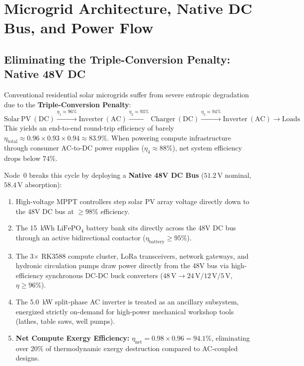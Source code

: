 \section{Microgrid Architecture, Native DC Bus, and Power Flow}
\label{sec:l1_microgrid}

\subsection{Eliminating the Triple-Conversion Penalty: Native 48V DC}

Conventional residential solar microgrids suffer from severe entropic degradation due to the \textbf{Triple-Conversion Penalty}:
\begin{equation}
\mathrm{Solar~PV~(DC)} \stackrel{\eta_1 \approx 96\%}{\longrightarrow} \mathrm{Inverter~(AC)} \stackrel{\eta_2 \approx 93\%}{\longrightarrow} \mathrm{Charger~(DC)} \stackrel{\eta_3 \approx 94\%}{\longrightarrow} \mathrm{Inverter~(AC)} \longrightarrow \mathrm{Loads}
\label{eq:ac_coupling_loss}
\end{equation}
This yields an end-to-end round-trip efficiency of barely $\eta_{\mathrm{total}} \approx 0.96 \times 0.93 \times 0.94 \approx 83.9\%$. When powering compute infrastructure through consumer AC-to-DC power supplies ($\eta_4 \approx 88\%$), net system efficiency drops below $74\%$.

Node~0 breaks this cycle by deploying a \textbf{Native 48V DC Bus} ($51.2\,\mathrm{V}$ nominal, $58.4\,\mathrm{V}$ absorption):
\begin{enumerate}
    \item High-voltage MPPT controllers step solar PV array voltage directly down to the 48V DC bus at $\ge 98\%$ efficiency.
    \item The 15~kWh $\mathrm{LiFePO}_4$ battery bank sits directly across the 48V DC bus through an active bidirectional contactor ($\eta_{\mathrm{battery}} \ge 95\%$).
    \item The 3$\times$ RK3588 compute cluster, LoRa transceivers, network gateways, and hydronic circulation pumps draw power directly from the 48V bus via high-efficiency synchronous DC-DC buck converters ($48\,\mathrm{V} \to 24\,\mathrm{V} / 12\,\mathrm{V} / 5\,\mathrm{V}$, $\eta \ge 96\%$).
    \item The 5.0~kW split-phase AC inverter is treated as an ancillary subsystem, energized strictly on-demand for high-power mechanical workshop tools (lathes, table saws, well pumps).
    \item \textbf{Net Compute Exergy Efficiency:} $\eta_{\mathrm{net}} = 0.98 \times 0.96 = 94.1\%$, eliminating over $20\%$ of thermodynamic exergy destruction compared to AC-coupled designs.
\end{enumerate}

